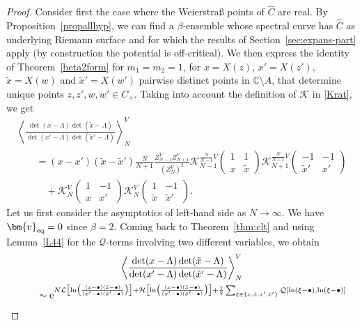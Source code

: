 \documentclass[10pt,a4paper]{amsart}
\numberwithin{equation}{section}
\newcommand{\mean}[1]{\left\langle{#1}\right\rangle}
\begin{document}
\begin{proof}
Consider first the case where the Weierstra\ss{} points of $\widehat{C}$ are
 real. By Proposition~\ref{propallhyp}, we can find a $\beta$-ensemble whose spectral curve has $\widehat{C}$ as underlying Riemann surface and for which the results of Section~\ref{sec:expans-part} apply (by construction the potential is off-critical).
 We then express the identity of Theorem~\ref{beta2form} for $m_1 = m_2 = 1$, for $x = X(z)$,
 $x' = X(z')$, $\tilde{x} = X(w)$ and $\tilde{x}' = X(w')$ pairwise distinct points in $\mathbb{C} \setminus A$, that determine unique points $z,z',w,w' \in C_+$. Taking into account the
 definition of $\mathcal{K}$ in \eqref{Krat}, we get
\begin{gather}
 \mean{ \frac{\det(x - \Lambda)\det(\tilde{x} - \Lambda)}{\det(x' - \Lambda) \det(\tilde{x}' - \Lambda)}}_{N}^{V}\nonumber \\
 \qquad{} = (x - x')(\tilde{x} - \tilde{x}')\frac{N}{N + 1} \frac{Z_{N - 1}^{V}Z_{N + 1}^{V}}{(Z_N^V)^2} \mathcal{K}^{\frac{N}{N - 1}V}_{N - 1}\left(\begin{matrix} 1 & 1 \\ x & \tilde{x} \end{matrix}\right) \mathcal{K}^{\frac{N}{N + 1}V}_{N + 1}\left(\begin{matrix} - 1 & -1 \\ \tilde{x}' & x' \end{matrix}\right)\nonumber\\
  \qquad\quad{} + \mathcal{K}_{N}^{V}\left(\begin{matrix} 1 & -1 \\ x & x' \end{matrix}\right)\mathcal{K}_{N}^{V}\left(\begin{matrix} 1 & -1 \\ \tilde{x} & \tilde{x}' \end{matrix}\right).\label{smallrelb2}
\end{gather}
Let us first consider the asymptotics of left-hand side as $N \rightarrow \infty$. We have $\bm{v}_{{\rm eq}} = 0$ since $\beta = 2$. Coming back to Theorem~\ref{thm:clt} and using Lemma~\ref{L44} for the $\mathcal{Q}$-terms involving two different variables, we obtain
\begin{gather}
 \mean{ \frac{\det(x - \Lambda)\det(\tilde{x} - \Lambda)}{\det(x' - \Lambda) \det(\tilde{x}' - \Lambda)}}_{N}^{V} \nonumber\\
\qquad {} \sim{}{\rm e}^{N\mathcal{L}\bigl[\ln\bigl(\frac{(x - \bullet)(\tilde{x} - \bullet)}{(x' - \bullet)(\tilde{x}' - \bullet)}\bigr)\bigr] + \mathcal{H}\bigl[\ln\bigl(\frac{(x - \bullet)(\tilde{x} - \bullet)}{(x' - \bullet)(\tilde{x}' - \bullet)}\bigr)\bigr] + \frac{1}{2} \sum_{\xi \in \{x,\tilde{x},x',\tilde{x}'\}} \mathcal{Q}[\ln(\xi - \bullet),\ln(\xi - \bullet)]} \nonumber\\

\end{gather}
\end{proof}
\end{document}

